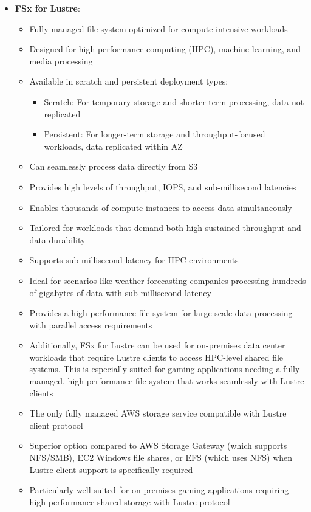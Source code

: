 \documentclass[11pt,a4paper]{report}
\begin{document}
\begin{itemize}
  \item \textbf{FSx for Lustre}:
\begin{itemize}
  \item Fully managed file system optimized for compute-intensive workloads
  \item Designed for high-performance computing (HPC), machine learning, and media processing
  \item Available in scratch and persistent deployment types:
\begin{itemize}
  \item Scratch: For temporary storage and shorter-term processing, data not replicated
  \item Persistent: For longer-term storage and throughput-focused workloads, data replicated within AZ
\end{itemize}
  \item Can seamlessly process data directly from S3
  \item Provides high levels of throughput, IOPS, and sub-millisecond latencies
  \item Enables thousands of compute instances to access data simultaneously
  \item Tailored for workloads that demand both high sustained throughput and data durability
  \item Supports sub-millisecond latency for HPC environments
  \item Ideal for scenarios like weather forecasting companies processing hundreds of gigabytes of data with sub-millisecond latency
  \item Provides a high-performance file system for large-scale data processing with parallel access requirements
  \item Additionally, FSx for Lustre can be used for on-premises data center workloads that require Lustre clients to access HPC-level shared file systems. This is especially suited for gaming applications needing a fully managed, high-performance file system that works seamlessly with Lustre clients
  \item The only fully managed AWS storage service compatible with Lustre client protocol
  \item Superior option compared to AWS Storage Gateway (which supports NFS/SMB), EC2 Windows file shares, or EFS (which uses NFS) when Lustre client support is specifically required
  \item Particularly well-suited for on-premises gaming applications requiring high-performance shared storage with Lustre protocol

\end{itemize}
\end{itemize}
\end{document}
